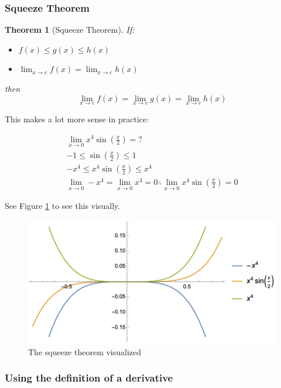 \documentclass[12pt]{article}
\newtheorem*{theorem}{Theorem}
\begin{document}
\subsubsection{Squeeze Theorem}

\begin{theorem}[Squeeze Theorem]
If: 
    \begin{itemize}
        \item $f(x) \leq g(x) \leq h(x)$ 

        \item $\lim_{x \to c} f(x) = \lim_{x \to c} h(x)$

    \end{itemize}
then \[\lim_{x\to c} f(x) = \lim_{x \to c} g(x) = \lim_{x \to c} h(x)\]
\end{theorem}

This makes a lot more sense in practice:

\begin{equation}
    \begin{split}
        \lim_{x\to0} x^4 \sin(\frac{x}{2}) = ?\\
        -1 \leq \sin(\frac{x}{2}) \leq 1\\
        -x^4 \leq x^4 \sin(\frac{x}{2}) \leq x^4\\
        \lim_{x\to 0} -x^4 = \lim_{x\to 0} x^4 = 0 \therefore \lim_{x\to0} x^4 \sin(\frac{x}{2}) = 0
    \end{split}
\end{equation}

See Figure \ref{squeeze} to see this visually.

\begin{figure}[!ht]
    \centering
    \includegraphics[width=12.0cm]{misc/squeezetheorem.png}
    \caption{The squeeze theorem visualized}
    \label{squeeze}
\end{figure}

\subsubsection{Using the definition of a derivative}
\end{document}
